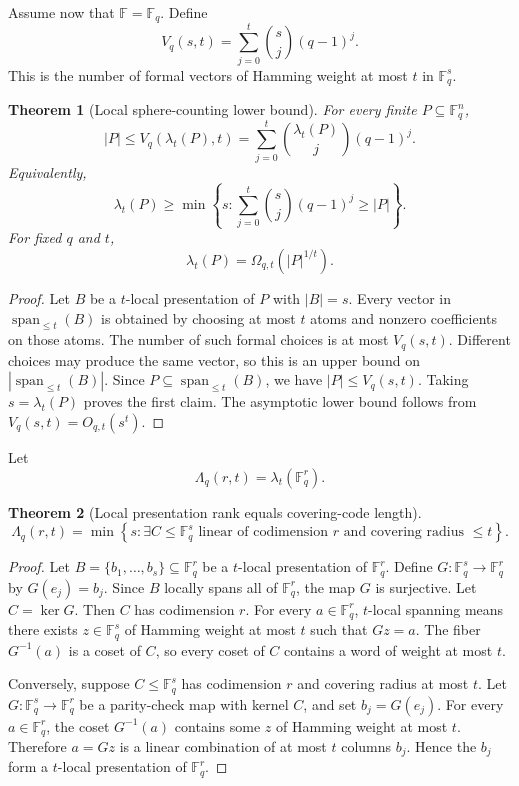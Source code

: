 \documentclass[11pt]{article}
\newtheorem{theorem}{Theorem}[section]
\begin{document}
Assume now that $\mathbb F=\mathbb F_q$. Define
\[
V_q(s,t)=\sum_{j=0}^t {s\choose j}(q-1)^j.
\]
This is the number of formal vectors of Hamming weight at most $t$ in $\mathbb F_q^s$.

\begin{theorem}[Local sphere-counting lower bound]
For every finite $P\subseteq\mathbb F_q^n$,
\[
|P|\le V_q(\lambda_t(P),t)
=
\sum_{j=0}^t {\lambda_t(P)\choose j}(q-1)^j.
\]
Equivalently,
\[
\lambda_t(P)
\ge
\min\left\{
s:\sum_{j=0}^t {s\choose j}(q-1)^j\ge |P|
\right\}.
\]
For fixed $q$ and $t$,
\[
\lambda_t(P)=\Omega_{q,t}(|P|^{1/t}).
\]
\end{theorem}

\begin{proof}
Let $B$ be a $t$-local presentation of $P$ with $|B|=s$. Every vector in $\operatorname{span}_{\le t}(B)$ is obtained by choosing at most $t$ atoms and nonzero coefficients on those atoms. The number of such formal choices is at most $V_q(s,t)$. Different choices may produce the same vector, so this is an upper bound on $|\operatorname{span}_{\le t}(B)|$. Since $P\subseteq \operatorname{span}_{\le t}(B)$, we have $|P|\le V_q(s,t)$. Taking $s=\lambda_t(P)$ proves the first claim. The asymptotic lower bound follows from $V_q(s,t)=O_{q,t}(s^t)$.
\end{proof}

Let
\[
\Lambda_q(r,t)=\lambda_t(\mathbb F_q^r).
\]

\begin{theorem}[Local presentation rank equals covering-code length]
\[
\Lambda_q(r,t)
=
\min\left\{
s:
\exists C\le\mathbb F_q^s
\text{ linear of codimension }r
\text{ and covering radius }\le t
\right\}.
\]
\end{theorem}

\begin{proof}
Let $B=\{b_1,\ldots,b_s\}\subseteq\mathbb F_q^r$ be a $t$-local presentation of $\mathbb F_q^r$. Define $G:\mathbb F_q^s\to\mathbb F_q^r$ by $G(e_j)=b_j$. Since $B$ locally spans all of $\mathbb F_q^r$, the map $G$ is surjective. Let $C=\ker G$. Then $C$ has codimension $r$. For every $a\in\mathbb F_q^r$, $t$-local spanning means there exists $z\in\mathbb F_q^s$ of Hamming weight at most $t$ such that $Gz=a$. The fiber $G^{-1}(a)$ is a coset of $C$, so every coset of $C$ contains a word of weight at most $t$.

Conversely, suppose $C\le\mathbb F_q^s$ has codimension $r$ and covering radius at most $t$. Let $G:\mathbb F_q^s\to\mathbb F_q^r$ be a parity-check map with kernel $C$, and set $b_j=G(e_j)$. For every $a\in\mathbb F_q^r$, the coset $G^{-1}(a)$ contains some $z$ of Hamming weight at most $t$. Therefore $a=Gz$ is a linear combination of at most $t$ columns $b_j$. Hence the $b_j$ form a $t$-local presentation of $\mathbb F_q^r$.
\end{proof}
\end{document}
